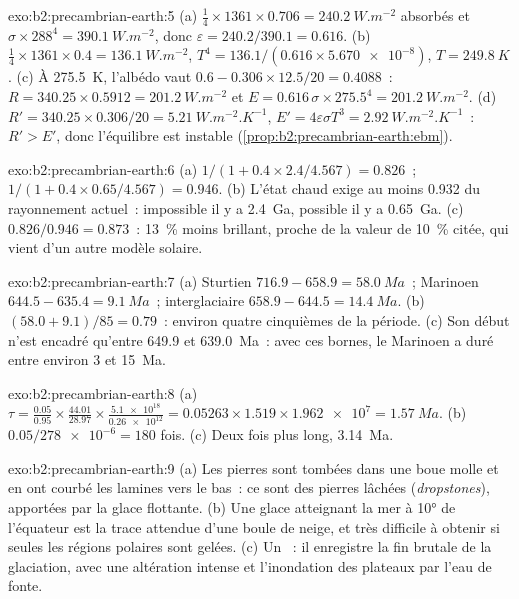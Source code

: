 \begin{solution}{exo:b2:precambrian-earth:5}
(a) $\tfrac14\times1361\times0.706 = \qty{240.2}{W.m^{-2}}$ absorbés et $\sigma\times288^4 =
\qty{390.1}{W.m^{-2}}$, donc $\varepsilon = 240.2/390.1 = 0.616$. (b) $\tfrac14\times1361\times0.4
= \qty{136.1}{W.m^{-2}}$, $T^4 = 136.1/(0.616\times\num{5.670e-8})$, $T = \qty{249.8}{K}$.
(c) À \qty{275.5}{K}, l'albédo vaut $0.6 - 0.306\times12.5/20 = 0.4088$~: $R = 340.25\times0.5912 =
\qty{201.2}{W.m^{-2}}$ et $E = 0.616\,\sigma\times275.5^4 = \qty{201.2}{W.m^{-2}}$. (d) $R' =
340.25\times0.306/20 = \qty{5.21}{W.m^{-2}.K^{-1}}$, $E' = 4\varepsilon\sigma T^3 =
\qty{2.92}{W.m^{-2}.K^{-1}}$~: $R' > E'$, donc l'équilibre est instable
(\cref{prop:b2:precambrian-earth:ebm}).
\end{solution}

\begin{solution}{exo:b2:precambrian-earth:6}
(a) $1/(1 + 0.4\times2.4/4.567) = 0.826$~; $1/(1 + 0.4\times0.65/4.567) = 0.946$. (b) L'état chaud
exige au moins 0.932 du rayonnement actuel~: impossible il y a \qty{2.4}{Ga}, possible
il y a \qty{0.65}{Ga}. (c) $0.826/0.946 = 0.873$~: \qty{13}{\percent} moins brillant, proche de la
valeur de \qty{10}{\percent} citée, qui vient d'un autre modèle solaire.
\end{solution}

\begin{solution}{exo:b2:precambrian-earth:7}
(a) Sturtien $716.9 - 658.9 = \qty{58.0}{Ma}$~; Marinoen $644.5 - 635.4 = \qty{9.1}{Ma}$~;
interglaciaire $658.9 - 644.5 = \qty{14.4}{Ma}$. (b) $(58.0 + 9.1)/85 = 0.79$~: environ quatre cinquièmes
de la période. (c) Son début n'est encadré qu'entre 649.9 et \qty{639.0}{Ma}~: avec ces
bornes, le Marinoen a duré entre environ 3 et \qty{15}{Ma}.
\end{solution}

\begin{solution}{exo:b2:precambrian-earth:8}
(a) $\tau = \frac{0.05}{0.95}\times\frac{44.01}{28.97}\times\frac{\num{5.1e18}}{\num{0.26e12}} =
0.05263\times1.519\times\num{1.962e7} = \qty{1.57}{Ma}$. (b) $0.05/\num{278e-6} = 180$ fois.
(c) Deux fois plus long, \qty{3.14}{Ma}.
\end{solution}

\begin{solution}{exo:b2:precambrian-earth:9}
(a) Les pierres sont tombées dans une boue molle et en ont courbé les lamines vers le bas~: ce sont des pierres lâchées (\textit{dropstones}), apportées par
la glace flottante. (b) Une glace atteignant la mer à \ang{10} de l'équateur est la trace attendue d'une
boule de neige, et très difficile à obtenir si seules les régions polaires sont gelées. (c) Un ~:
il enregistre la fin brutale de la glaciation, avec une altération intense et l'inondation des
plateaux par l'eau de fonte.
\end{solution}


